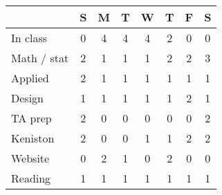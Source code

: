 \documentclass{article}
\begin{document}
\begin{table}
\centering
\begin{tabular}{lccccccc}
 & S & M & T & W & T & F & S \\
\midrule
In class & 0 & 4 & 4 & 4 & 2 & 0 & 0 \\
\midrule
Math / stat & 2 & 1 & 1 & 1 & 2 & 2 & 3 \\
Applied & 2 & 1 & 1 & 1 & 1 & 1 & 1 \\
Design & 1 & 1 & 1 & 1 & 1  & 2 & 1 \\
\midrule
TA prep & 2 & 0 & 0 & 0 & 0 & 0 & 2 \\
Keniston & 2 & 0 & 0 & 1 & 1 & 2 & 2 \\
Website & 0 & 2 & 1 & 0 & 2 & 0 & 0 \\
\midrule
Reading & 1 & 1 & 1 & 1 & 1 & 1 & 1
\end{tabular}
\end{table}
\end{document}

